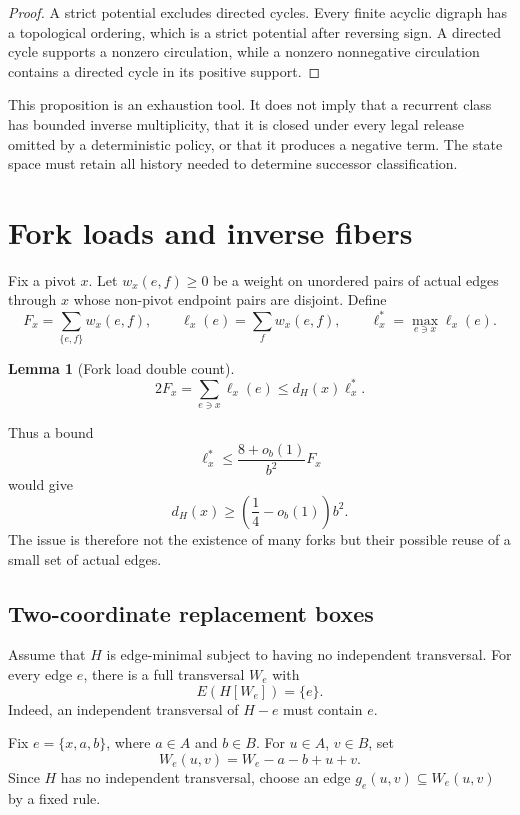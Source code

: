\documentclass[11pt]{article}
\newtheorem{lemma}[theorem]{Lemma}
\begin{document}
\begin{proof}
A strict potential excludes directed cycles.  Every finite acyclic digraph has
a topological ordering, which is a strict potential after reversing sign.  A
directed cycle supports a nonzero circulation, while a nonzero nonnegative
circulation contains a directed cycle in its positive support.
\end{proof}

This proposition is an exhaustion tool.  It does not imply that a recurrent
class has bounded inverse multiplicity, that it is closed under every legal
release omitted by a deterministic policy, or that it produces a negative
term.  The state space must retain all history needed to determine successor
classification.

\section{Fork loads and inverse fibers}

Fix a pivot \(x\).  Let \(w_x(e,f)\ge0\) be a weight on unordered pairs of
actual edges through \(x\) whose non-pivot endpoint pairs are disjoint.  Define
\[
  F_x=\sum_{\{e,f\}}w_x(e,f),
  \qquad
  \ell_x(e)=\sum_f w_x(e,f),
  \qquad
  \ell_x^*=\max_{e\ni x}\ell_x(e).
\]

\begin{lemma}[Fork load double count]\label{lem:fork-load}
\[
  2F_x=\sum_{e\ni x}\ell_x(e)
  \le d_H(x)\ell_x^*.
\]
\end{lemma}

Thus a bound
\[
  \ell_x^*\le\frac{8+o_b(1)}{b^2}F_x
\]
would give
\[
  d_H(x)\ge\left(\frac14-o_b(1)\right)b^2.
\]
The issue is therefore not the existence of many forks but their possible
reuse of a small set of actual edges.

\subsection{Two-coordinate replacement boxes}

Assume that \(H\) is edge-minimal subject to having no independent
transversal.  For every edge \(e\), there is a full transversal \(W_e\) with
\[
  E(H[W_e])=\{e\}.
\]
Indeed, an independent transversal of \(H-e\) must contain \(e\).

Fix \(e=\{x,a,b\}\), where \(a\in A\) and \(b\in B\).  For
\(u\in A\), \(v\in B\), set
\[
  W_e(u,v)=W_e-a-b+u+v.
\]
Since \(H\) has no independent transversal, choose an edge
\(g_e(u,v)\subseteq W_e(u,v)\) by a fixed rule.
\end{document}

